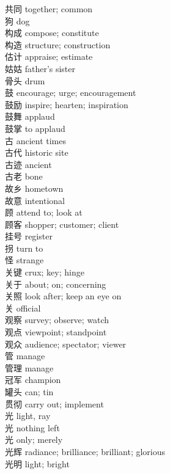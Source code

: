 共同 \quad together; common\\
狗 \quad dog\\
构成 \quad compose; constitute\\
构造 \quad structure; construction\\
估计 \quad appraise; estimate\\
姑姑 \quad father's sister\\
骨头 \quad drum\\
鼓 \quad encourage; urge; encouragement\\
鼓励 \quad inspire; hearten; inspiration\\
鼓舞 \quad applaud\\
鼓掌 \quad to applaud\\
古 \quad ancient times\\
古代 \quad historic site\\
古迹 \quad ancient\\
古老 \quad bone\\
故乡 \quad hometown\\
故意 \quad intentional\\
顾 \quad attend to; look at\\
顾客 \quad shopper; customer; client\\
挂号 \quad register\\
拐 \quad turn to\\
怪 \quad strange\\
关键 \quad crux; key; hinge\\
关于 \quad about; on; concerning\\
关照 \quad look after; keep an eye on\\
关 \quad official\\
观察 \quad survey; observe; watch\\
观点 \quad viewpoint; standpoint\\
观众 \quad audience; spectator; viewer\\
管 \quad manage\\
管理 \quad manage\\
冠军 \quad champion\\
罐头 \quad can; tin\\
贯彻 \quad carry out; implement\\
光 \quad light, ray\\
光 \quad nothing left\\
光 \quad only; merely\\
光辉 \quad radiance; brilliance; brilliant; glorious\\
光明 \quad light; bright\\
